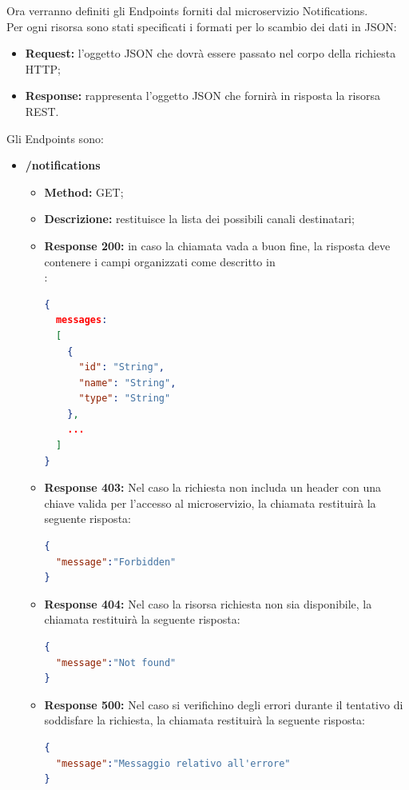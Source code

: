 Ora verranno definiti gli Endpoints forniti dal microservizio Notifications. \\
Per ogni risorsa sono stati specificati i formati per lo scambio dei dati in JSON:
\begin{itemize}
\item \textbf{Request:} l’oggetto JSON che dovrà essere passato nel corpo della richiesta HTTP;
\item \textbf{Response:} rappresenta l’oggetto JSON che fornirà in risposta la risorsa REST.
\end{itemize}
Gli Endpoints sono:
\begin{itemize}

\item \textbf{/notifications}\\
\begin{itemize}
\item \textbf{Method:} GET;
\item \textbf{Descrizione:} restituisce la lista dei possibili canali destinatari;
\item \textbf{Response 200:} in caso la chiamata vada a buon fine, la risposta deve contenere i campi organizzati come descritto in \\:
\begin{lstlisting}[language=json,firstnumber=1]
{
  messages:
  [
    {
      "id": "String",
      "name": "String",
      "type": "String"
    },
    ...
  ]
}
\end{lstlisting}
\item \textbf{Response 403:} Nel caso la richiesta non includa un header  con una chiave valida per l'accesso al microservizio, la chiamata restituirà la seguente risposta:
\begin{lstlisting}[language=json,firstnumber=1]
{
  "message":"Forbidden"
}
\end{lstlisting}
\item \textbf{Response 404:} Nel caso la risorsa richiesta non sia disponibile, la chiamata restituirà la seguente risposta:
\begin{lstlisting}[language=json,firstnumber=1]
{
  "message":"Not found"
}
\end{lstlisting}
\item \textbf{Response 500:} Nel caso si verifichino degli errori durante il tentativo di soddisfare la richiesta, la chiamata restituirà la seguente risposta:
\begin{lstlisting}[language=json,firstnumber=1]
{
  "message":"Messaggio relativo all'errore"
}
\end{lstlisting}
\end{itemize}


\end{itemize}

